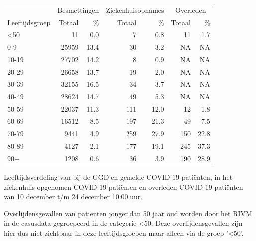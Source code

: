 \documentclass[
  english,
  man,floatsintext]{apa6}
\begin{document}
\begin{table}
\centering\begingroup\fontsize{11}{13}\selectfont

\begin{threeparttable}
\begin{tabular}{lrrrrrr}
\toprule
\multicolumn{1}{c}{ } & \multicolumn{2}{c}{Besmettingen} & \multicolumn{2}{c}{Ziekenhuisopnames} & \multicolumn{2}{c}{Overleden} \\
\cmidrule(l{3pt}r{3pt}){2-3} \cmidrule(l{3pt}r{3pt}){4-5} \cmidrule(l{3pt}r{3pt}){6-7}
Leeftijdsgroep & Totaal & \% & Totaal & \% & Totaal & \%\\
\midrule
<50 & 11 & 0.0 & 7 & 0.8 & 11 & 1.7\\
0-9 & 25959 & 13.4 & 30 & 3.2 & NA & NA\\
10-19 & 27702 & 14.2 & 8 & 0.9 & NA & NA\\
20-29 & 26658 & 13.7 & 19 & 2.0 & NA & NA\\
30-39 & 32155 & 16.5 & 34 & 3.7 & NA & NA\\
40-49 & 28624 & 14.7 & 49 & 5.3 & NA & NA\\
50-59 & 22037 & 11.3 & 111 & 12.0 & 12 & 1.8\\
60-69 & 16512 & 8.5 & 197 & 21.3 & 49 & 7.5\\
70-79 & 9441 & 4.9 & 259 & 27.9 & 150 & 22.8\\
80-89 & 4127 & 2.1 & 177 & 19.1 & 245 & 37.3\\
90+ & 1208 & 0.6 & 36 & 3.9 & 190 & 28.9\\
\bottomrule
\end{tabular}
\begin{tablenotes}
\item[1] Leeftijdsverdeling van bij de GGD’en gemelde COVID-19 patiënten, in het ziekenhuis opgenomen COVID-19 patiënten en overleden COVID-19 patiënten van 10 december t/m 24 december 10:00 uur.
\item[2] Overlijdensgevallen van patiënten jonger dan 50 jaar oud worden door het RIVM in de casusdata gegroepeerd in de categorie <50. Deze overlijdensgevallen zijn hier dus niet zichtbaar in deze leeftijdsgroepen maar alleen via de groep '<50'.
\end{tablenotes}
\end{threeparttable}
\endgroup{}
\end{table}

\newpage
\end{document}
